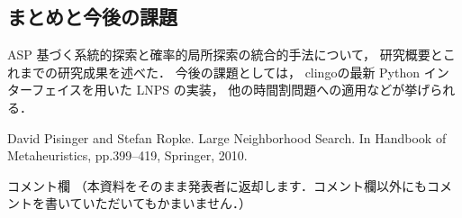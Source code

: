 \documentclass[a4j,10pt]{jarticle}
\begin{document}
\begin{multicols}{1}
\section{まとめと今後の課題}
ASP 基づく系統的探索と確率的局所探索の統合的手法について，
研究概要とこれまでの研究成果を述べた．
今後の課題としては，
\textsf{clingo}の最新 Python インターフェイスを用いた LNPS の実装，
他の時間割問題への適用などが挙げられる．

\begin{thebibliography}{10}
David Pisinger and Stefan Ropke. 
Large Neighborhood Search. 
In Handbook of Metaheuristics,
pp.399--419, Springer, 2010.
\end{thebibliography}

\end{multicols}
\vfill
\noindent
{\gt コメント欄}
{\footnotesize
（本資料をそのまま発表者に返却します．コメント欄以外にもコメントを書いていただいてもかまいません．）}
\\
\fbox{\begin{minipage}{\textwidth}\noindent\\\\\end{minipage}}	
\end{document}
